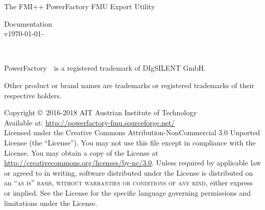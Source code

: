 \documentclass[11pt,fleqn,oneside,openany]{book} %
\newcommand{\versionsep}{-}
\newcommand{\fmipp}{FMI++\xspace}
\newcommand{\pf}{PowerFactory\xspace}
\begin{document}

\begingroup
\thispagestyle{empty}
\centering
\vspace*{9.35cm}
\par\normalfont\fontsize{29}{30}\sffamily\selectfont
The \fmipp \pf FMU Export Utility\par %
\vspace*{0.5cm}
{\huge Documentation}\\[5pt]
{\normalsize v\yyyymmdddate\today\versionsep\currenttime}\par %
\endgroup


\newpage
~\vfill
\thispagestyle{empty}

\noindent \pf~\textregistered~is a registered trademark of DIgSILENT GmbH.

\noindent Other product or brand names are trademarks or registered trademarks of their respective holders.

\vspace*{2cm}

\noindent Copyright \copyright\ 2016-2018 AIT Austrian Institute of Technology\\ %


\noindent Available at: \url{http://powerfactory-fmu.sourceforge.net/}\\ %

\noindent Licensed under the Creative Commons Attribution-NonCommercial 3.0 Unported License (the ``License''). You may not use this file except in compliance with the License. You may obtain a copy of the License at \url{http://creativecommons.org/licenses/by-nc/3.0}. Unless required by applicable law or agreed to in writing, software distributed under the License is distributed on an \textsc{``as is'' basis, without warranties or conditions of any kind}, either express or implied. See the License for the specific language governing permissions and limitations under the License.\\ %
\end{document}
